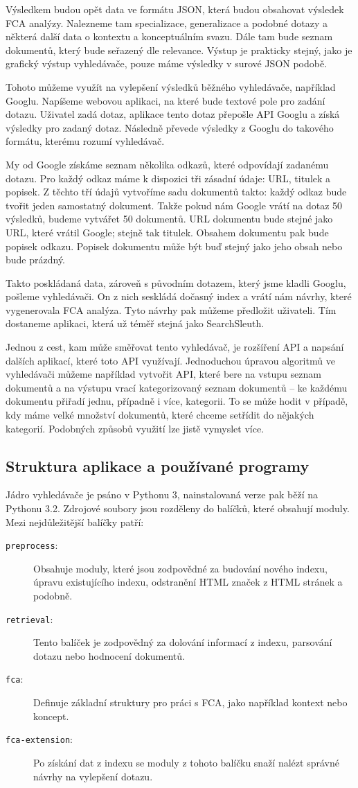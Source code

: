 \documentclass[12pt]{article}
\newcommand{\code}[1]{\texttt{#1}}
\newcommand{\ssection}[1]{\subsection{#1}}
\begin{document}
Výsledkem budou opět data ve formátu JSON, která budou obsahovat výsledek FCA analýzy. Nalezneme tam specializace, generalizace a podobné dotazy a některá další data o kontextu a konceptuálním svazu. Dále tam bude seznam dokumentů, který bude seřazený dle relevance. Výstup je prakticky stejný, jako je grafický výstup vyhledávače, pouze máme výsledky v surové JSON podobě. 

Tohoto můžeme využít na vylepšení výsledků běžného vyhledávače, například Googlu. Napíšeme webovou aplikaci, na které bude textové pole pro zadání dotazu. Uživatel zadá dotaz, aplikace tento dotaz přepošle API Googlu a získá výsledky pro zadaný dotaz. Následně převede výsledky z Googlu do takového formátu, kterému rozumí vyhledávač.

My od Google získáme seznam několika odkazů, které odpovídají zadanému dotazu. Pro každý odkaz máme k dispozici tři zásadní údaje: URL, titulek a popisek. Z těchto tří údajů vytvoříme sadu dokumentů takto: každý odkaz bude tvořit jeden samostatný dokument. Takže pokud nám Google vrátí na dotaz 50 výsledků, budeme vytvářet 50 dokumentů. URL dokumentu bude stejné jako URL, které vrátil Google; stejně tak titulek. Obsahem dokumentu pak bude popisek odkazu. Popisek dokumentu může být buď stejný jako jeho obsah nebo bude prázdný.

Takto poskládaná data, zároveň s původním dotazem, který jsme kladli Googlu, pošleme vyhledávači. On z nich seskládá dočasný index a vrátí nám návrhy, které vygenerovala FCA analýza. Tyto návrhy pak můžeme předložit uživateli. Tím dostaneme aplikaci, která už téměř stejná jako SearchSleuth.

Jednou z cest, kam může směřovat tento vyhledávač, je rozšíření API a napsání dalších aplikací, které toto API využívají. Jednoduchou úpravou algoritmů ve vyhledávači můžeme například vytvořit API, které bere na vstupu seznam dokumentů a na výstupu vrací kategorizovaný seznam dokumentů -- ke každému dokumentu přiřadí jednu, případně i více, kategorii. To se může hodit v případě, kdy máme velké množství dokumentů, které chceme setřídit do nějakých kategorií. Podobných způsobů využití lze jistě vymyslet více. 


\ssection{Struktura aplikace a používané programy}
Jádro vyhledávače je psáno v Pythonu 3, nainstalovaná verze pak běží na Pythonu 3.2. Zdrojové soubory jsou rozděleny do balíčků, které obsahují moduly. Mezi nejdůležitější balíčky patří: 

\begin{description}
	\item[\code{preprocess}:] Obsahuje moduly, které jsou zodpovědné za budování nového indexu, úpravu existujícího indexu, odstranění HTML značek z HTML stránek a podobně. 
	\item[\code{retrieval}:] Tento balíček je zodpovědný za dolování informací z indexu, parsování dotazu nebo hodnocení dokumentů. 
	\item[\code{fca}:] Definuje základní struktury pro práci s FCA, jako například kontext nebo koncept. 
	\item[\code{fca-extension}:] Po získání dat z indexu se moduly z tohoto balíčku snaží nalézt správné návrhy na vylepšení dotazu. 
\end{description}
\end{document}
